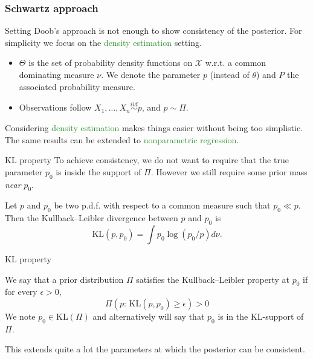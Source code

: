 \subsubsection{Schwartz approach}


\begin{frame}{Setting}
Doob's approach is not enough to show consistency of the posterior. For simplicity we focus on the \textcolor{forestgreen}{density estimation} setting.
\begin{itemize}
 \item $\Theta$ is the set of probability density functions on $\mathcal{X}$ w.r.t. a common dominating measure $\nu$. We denote the parameter $p$ (instead of $\theta$) and $P$ the associated probability measure. 
 \item Observations follow $X_1, \dots, X_n \overset{iid}{\sim} p$, and $p\sim \Pi$.
 \end{itemize}
\pause 

Considering  \textcolor{forestgreen}{density estimation} makes things easier  without being too simplistic. The same results can be extended to  \textcolor{forestgreen}{nonparametric regression}.  
\end{frame}


\begin{frame}{KL property}
To achieve consistency, we do not want to require that the true parameter $p_0$ is  \textcolor{orange2}{inside} the support of $\Pi$. However we still require \textcolor{orange2}{some prior mass \emph{near} $p_0$}. 
\begin{definition}
Let $p$ and $p_0$ be two p.d.f. with respect to a common measure such that $p_0 \ll p$. Then the Kullback--Leibler divergence between $p$ and $p_0$ is 
$$
\text{KL}(p,p_0) = \int p_0 \log(p_0/p) d\nu.
$$ 
\end{definition}

\end{frame}

\begin{frame}{KL property}
\begin{definition}[KL property]
We say that a prior distribution $\Pi$ satisfies the \textcolor{orange2}{Kullback--Leibler property} at $p_0$ if for every $\epsilon>0$, 
$$
\Pi(p:\,\text{KL}(p,p_0)\geq \epsilon) >0 
$$
We note $p_0\in \text{KL}(\Pi)$ and alternatively will say that $p_0$ is in the KL-support of $\Pi$.
\end{definition}
\pause
This extends quite a lot the parameters at which the posterior can be consistent. 
\end{frame}



